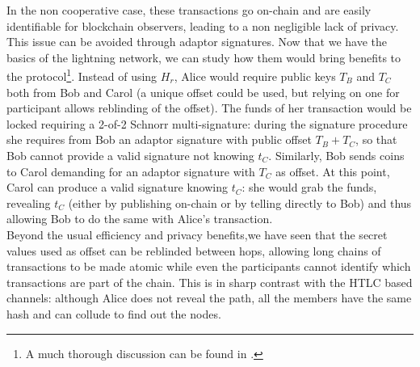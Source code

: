 \bigskip
\noindent
In the non cooperative case, these transactions go on-chain and are easily identifiable for blockchain observers, leading to a non negligible lack of privacy. This issue can be avoided through adaptor signatures. Now that we have the basics of the lightning network, we can study how them would bring benefits to the protocol\footnote{A much thorough discussion can be found in \cite{RefWork:17}.}. Instead of using $H_r$, Alice would require public keys $T_B$ and $T_C$ both from Bob and Carol (a unique offset could be used, but relying on one for participant allows reblinding of the offset). The funds of her transaction would be locked requiring a 2-of-2 Schnorr multi-signature: during the signature procedure she requires from Bob an adaptor signature with public offset $T_B + T_C$, so that Bob cannot provide a valid signature not knowing $t_C$. Similarly, Bob sends coins to Carol demanding for an adaptor signature with $T_C$ as offset. At this point, 
Carol can produce a valid signature knowing $t_C$: she would grab the funds, revealing $t_C$ (either by publishing on-chain or by telling directly to Bob) and thus allowing Bob to do the same with Alice's transaction.
\\
Beyond the usual efficiency and privacy benefits,we have seen that the secret values used as offset can be reblinded between hops, allowing long chains of transactions to be made atomic while even the participants cannot identify which transactions are part of the chain. This is in sharp contrast with the HTLC based channels: although Alice does not reveal the path, all the members have the same hash and can collude to find out the nodes.

